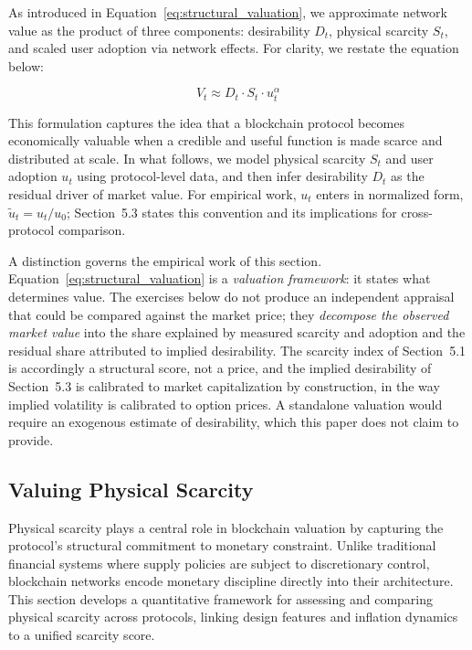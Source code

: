 \documentclass[12pt]{article}
\begin{document}
As introduced in Equation~\ref{eq:structural_valuation}, we approximate network value as the product of three components: desirability \( D_t \), physical scarcity \( S_t \), and scaled user adoption via network effects. For clarity, we restate the equation below:

\begin{equation*}
V_t \approx D_t \cdot S_t \cdot u_t^{\alpha}
\end{equation*}

This formulation captures the idea that a blockchain protocol becomes economically valuable when a credible and useful function is made scarce and distributed at scale. In what follows, we model physical scarcity \( S_t \) and user adoption \( u_t \) using protocol-level data, and then infer desirability \( D_t \) as the residual driver of market value. For empirical work, \( u_t \) enters in normalized form, \( \tilde{u}_t = u_t / u_0 \); Section~5.3 states this convention and its implications for cross-protocol comparison.

\begin{tcolorbox}[title=\textbf{Remark: Valuation Framework versus Valuation Attribution}]
A distinction governs the empirical work of this section. Equation~\eqref{eq:structural_valuation} is a \emph{valuation framework}: it states what determines value. The exercises below do not produce an independent appraisal that could be compared against the market price; they \emph{decompose the observed market value} into the share explained by measured scarcity and adoption and the residual share attributed to implied desirability. The scarcity index of Section~5.1 is accordingly a structural score, not a price, and the implied desirability of Section~5.3 is calibrated to market capitalization by construction, in the way implied volatility is calibrated to option prices. A standalone valuation would require an exogenous estimate of desirability, which this paper does not claim to provide.
\end{tcolorbox}

\subsection{Valuing Physical Scarcity}

Physical scarcity plays a central role in blockchain valuation by capturing the protocol’s structural commitment to monetary constraint. Unlike traditional financial systems where supply policies are subject to discretionary control, blockchain networks encode monetary discipline directly into their architecture. This section develops a quantitative framework for assessing and comparing physical scarcity across protocols, linking design features and inflation dynamics to a unified scarcity score.
\end{document}
